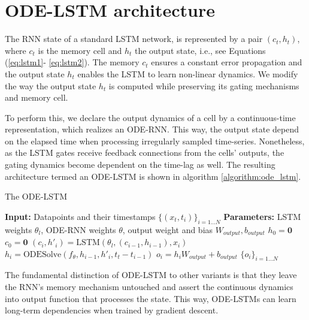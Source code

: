 \documentclass{article}
\begin{document}
\section{ODE-LSTM architecture}
The RNN state of a standard LSTM network, is represented by a pair $(c_t,h_t)$, where $c_t$ is the memory cell and $h_t$ the output state, i.e., see Equations (\ref{eq:lstm1}- \ref{eq:lstm2}). The memory $c_t$ ensures a constant error propagation and the output state $h_t$ enables the LSTM to learn non-linear dynamics. We modify the way the output state $h_t$ is computed while preserving its gating mechanisms and memory cell.

To perform this, we declare the output dynamics of a cell by a continuous-time representation, which realizes an ODE-RNN. This way, the output state depend on the elapsed time when processing irregularly sampled time-series. Nonetheless, as the LSTM gates receive feedback connections from the cells' outputs, the gating dynamics become dependent on the time-lag as well. The resulting architecture termed an ODE-LSTM is shown in algorithm \ref{algorithm:ode_lstm}. 

\begin{algorithm}[t]
\caption{The ODE-LSTM}
\label{algorithm:ode_lstm}
\begin{algorithmic}
\STATE \textbf{Input:} Datapoints and their timestamps $\{(x_t,t_i) \}_{i=1\dots N}$
\STATE \textbf{Parameters:} LSTM weights $\theta_l$, ODE-RNN weights $\theta$, output weight and bias $W_{output}, b_{output}$ 
\STATE $h_0 = \mathbf{0}$ 
\STATE $c_0 = \mathbf{0}$ 
\STATE $(c_i,h'_i) = \text{LSTM}(\theta_l,(c_{i-1},h_{i-1}),x_i)$
\STATE $h_i = \text{ODESolve}(f_\theta,h_{i-1},h'_i,t_t-t_{i-1}) $ 
\STATE $o_i = h_i W_{output} + b_{output}$
\ENDFOR
\RETURN $\{o_i\}_{i=1\dots N}$
\end{algorithmic}
\end{algorithm}

The fundamental distinction of ODE-LSTM to other variants is that they leave the RNN's memory mechanism untouched and assert the continuous dynamics into output function that processes the state. This way, ODE-LSTMs can learn long-term dependencies when trained by gradient descent. 
\end{document}
